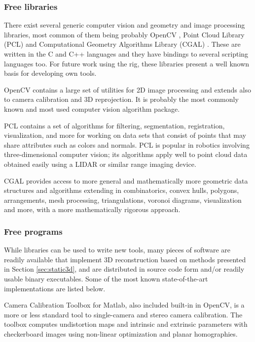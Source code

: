 
\subsubsection{Free libraries} %

There exist several generic computer vision and geometry and image processing libraries, most common of them being probably OpenCV \cite{opencv}, Point Cloud Library (PCL) \cite{pcl} and Computational Geometry Algorithms Library (CGAL) \cite{cgal}.
These are written in the C and C++ languages and they have bindings to several scripting languages too.
For future work using the rig, these libraries present a well known basis for developing own tools.

OpenCV contains a large set of utilities for 2D image processing and extends also to camera calibration and 3D reprojection.
It is probably the most commonly known and most used computer vision algorithm package.

PCL contains a set of algorithms for filtering, segmentation, registration, visualization, and more for working on data sets that consist of points that may share attributes such as colors and normals.
PCL is popular in robotics involving three-dimensional computer vision; its algorithms apply well to point cloud data obtained easily using a LIDAR or similar range imaging device.

CGAL provides access to more general and mathematically more geometric data structures and algorithms extending in combinatorics, convex hulls, polygons, arrangements, mesh processing, triangulations, voronoi diagrams, visualization and more, with a more mathematically rigorous approach.


\subsubsection{Free programs} %

While libraries can be used to write new tools, many pieces of software are readily available that implement 3D reconstruction based on methods presented in Section \ref{sec:static3d}, and are distributed in source code form and/or readily usable binary executables.
Some of the most known state-of-the-art implementations are listed below.

Camera Calibration Toolbox for Matlab, also included built-in in OpenCV, is a more or less standard tool to single-camera and stereo camera calibration.
The toolbox computes undistortion maps and intrinsic and extrinsic parameters with checkerboard images using non-linear optimization and planar homographies. \cite{camcalmatlab}

